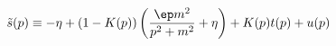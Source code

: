 \begin{equation}
\tilde{s} (p) \equiv - \eta + (1 - K(p))
\left( \frac{\ep m^2}{p^2 + m^2} + \eta \right)  + K(p) t(p) + u(p)
\end{equation}

